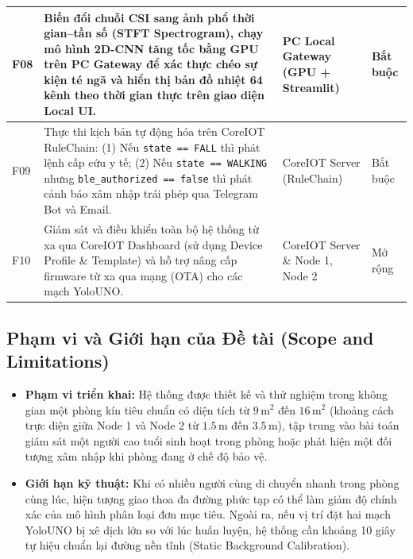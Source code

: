 \documentclass{hcmut-report}
\begin{document}
\begin{table}[H]
\begin{tabularx}{\textwidth}{|C{0.8cm}|Y|P{3.4cm}|C{1.5cm}|}
\hline
F08 & Biến đổi chuỗi CSI sang ảnh phổ thời gian--tần số (STFT Spectrogram), chạy mô hình 2D-CNN tăng tốc bằng GPU trên PC Gateway để xác thực chéo sự kiện té ngã và hiển thị bản đồ nhiệt 64 kênh theo thời gian thực trên giao diện Local UI. & PC Local Gateway (GPU + Streamlit) & Bắt buộc \\
\hline
F09 & Thực thi kịch bản tự động hóa trên CoreIOT RuleChain: (1) Nếu \texttt{state == FALL} thì phát lệnh cấp cứu y tế; (2) Nếu \texttt{state == WALKING} nhưng \texttt{ble\_authorized == false} thì phát cảnh báo xâm nhập trái phép qua Telegram Bot và Email. & CoreIOT Server (RuleChain) & Bắt buộc \\
\hline
F10 & Giám sát và điều khiển toàn bộ hệ thống từ xa qua CoreIOT Dashboard (sử dụng Device Profile \& Template) và hỗ trợ nâng cấp firmware từ xa qua mạng (OTA) cho các mạch YoloUNO. & CoreIOT Server \& Node 1, Node 2 & Mở rộng \\
\hline
\end{tabularx}
\end{table}

\subsection[Phạm vi và Giới hạn của Đề tài]{Phạm vi và Giới hạn của Đề tài (Scope and Limitations)}
\begin{itemize}
  \item \textbf{Phạm vi triển khai:} Hệ thống được thiết kế và thử nghiệm trong không gian một phòng kín tiêu chuẩn có diện tích từ $9\,\text{m}^2$ đến $16\,\text{m}^2$ (khoảng cách trực diện giữa Node 1 và Node 2 từ $1.5\,\text{m}$ đến $3.5\,\text{m}$), tập trung vào bài toán giám sát một người cao tuổi sinh hoạt trong phòng hoặc phát hiện một đối tượng xâm nhập khi phòng đang ở chế độ bảo vệ.
  \item \textbf{Giới hạn kỹ thuật:} Khi có nhiều người cùng di chuyển nhanh trong phòng cùng lúc, hiện tượng giao thoa đa đường phức tạp có thể làm giảm độ chính xác của mô hình phân loại đơn mục tiêu. Ngoài ra, nếu vị trí đặt hai mạch YoloUNO bị xê dịch lớn so với lúc huấn luyện, hệ thống cần khoảng 10 giây tự hiệu chuẩn lại đường nền tĩnh (Static Background Calibration).
\end{itemize}
\end{document}
